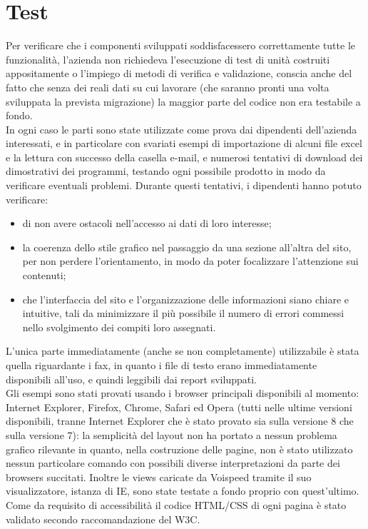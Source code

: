 \section{Test}
Per verificare che i componenti sviluppati soddisfacessero correttamente tutte le funzionalit\`a, l'azienda non richiedeva l'esecuzione di test di unit\`a costruiti appositamente o l'impiego di metodi di verifica e validazione, conscia anche del fatto che senza dei reali dati su cui lavorare (che saranno pronti una volta sviluppata la prevista migrazione) la maggior parte del codice non era testabile a fondo.\\
 In ogni caso le parti sono state utilizzate come prova dai dipendenti dell'azienda interessati, e in particolare con svariati esempi di importazione di alcuni file excel e la lettura con successo della casella e-mail, e numerosi tentativi di download dei dimostrativi dei programmi, testando ogni possibile prodotto in modo da verificare eventuali problemi. Durante questi tentativi, i dipendenti hanno potuto verificare:
\begin{itemize}
 \item di non avere ostacoli nell'accesso ai dati di loro interesse; 
 \item la coerenza dello stile grafico nel passaggio da una sezione all'altra del sito, per non perdere l'orientamento, in modo da poter focalizzare l'attenzione sui contenuti;
 \item che l’interfaccia del sito e l’organizzazione delle informazioni siano chiare e intuitive, tali da minimizzare il pi\`u possibile il numero di errori commessi nello svolgimento dei compiti loro assegnati.
\end{itemize}
\noindent
L'unica parte immediatamente (anche se non completamente) utilizzabile \`e stata quella riguardante i fax, in quanto i file di testo erano immediatamente disponibili all'uso, e quindi leggibili dai report sviluppati. \\
Gli esempi sono stati provati usando i browser principali disponibili al momento: Internet Explorer, Firefox, Chrome, Safari ed Opera (tutti nelle ultime versioni disponibili, tranne Internet Explorer che \`e stato provato sia sulla versione 8 che sulla versione 7): la semplicit\`a del layout non ha portato a nessun problema grafico rilevante in quanto, nella costruzione delle pagine, non \`e stato utilizzato nessun particolare comando con possibili diverse interpretazioni da parte dei browsers succitati. Inoltre le views caricate da Voispeed tramite il suo visualizzatore, istanza di IE, sono state testate a fondo proprio con quest'ultimo. \\
Come da requisito di accessibilit\`a il codice HTML/CSS di ogni pagina \`e stato validato secondo raccomandazione del W3C. 

